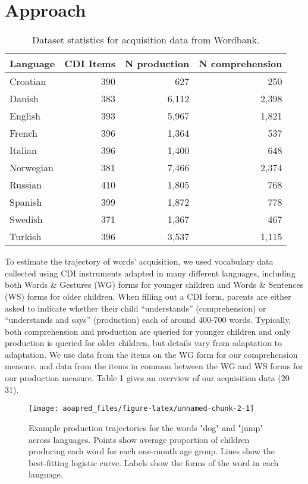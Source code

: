 \documentclass[english,man]{apa6}
\theoremstyle{definition}
\theoremstyle{definition}
\theoremstyle{definition}
\theoremstyle{remark}
\begin{document}
\section*{Approach}\label{approach}

\begin{table}[b]
\centering
\begin{tabular}{lrrr}
  \hline
Language & CDI Items & N production & N comprehension \\ 
  \hline
Croatian & 390 & 627 & 250 \\ 
  Danish & 383 & 6,112 & 2,398 \\ 
  English & 393 & 5,967 & 1,821 \\ 
  French & 396 & 1,364 & 537 \\ 
  Italian & 396 & 1,400 & 648 \\ 
  Norwegian & 381 & 7,466 & 2,374 \\ 
  Russian & 410 & 1,805 & 768 \\ 
  Spanish & 399 & 1,872 & 778 \\ 
  Swedish & 371 & 1,367 & 467 \\ 
  Turkish & 396 & 3,537 & 1,115 \\ 
   \hline
\end{tabular}
\caption{Dataset statistics for acquisition data from Wordbank.} 
\label{table:lang_stats}
\end{table}

To estimate the trajectory of words' acquisition, we used vocabulary
data collected using CDI instruments adapted in many different
languages, including both Words \& Gestures (WG) forms for younger
children and Words \& Sentences (WS) forms for older children. When
filling out a CDI form, parents are either asked to indicate whether
their child \enquote{understands} (comprehension) or
\enquote{understands and says} (production) each of around 400-700
words. Typically, both comprehension and production are queried for
younger children and only production is queried for older children, but
details vary from adaptation to adaptation. We use data from the items
on the WG form for our comprehension measure, and data from the items in
common between the WG and WS forms for our production measure. Table 1
gives an overview of our acquisition data (20--31).

\begin{figure*}

{\centering \texttt{[image: aoapred\_files/figure-latex/unnamed-chunk-2-1]} 

}

\caption{Example production trajectories for the words "dog" and "jump" across languages. Points show average proportion of children producing each word for each one-month age group. Lines show the best-fitting logistic curve. Labels show the forms of the word in each language.}\label{fig:unnamed-chunk-2}
\end{figure*}
\end{document}

